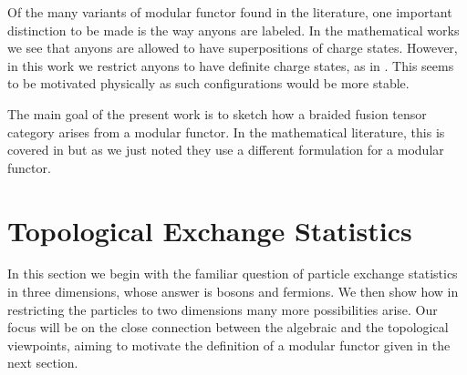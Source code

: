 Of the many variants of modular functor found in the literature,
one important distinction to be made is
the way anyons are labeled.
In the mathematical works \cite{Turaev1994, Bakalov2001, Tillmann1998} 
we see that anyons are allowed to have superpositions
of charge states. 
However, in this work we restrict anyons to have
definite charge states, as in \cite{Walker1991,Freedman2002simulation,Beverland2014}. 
This seems to be motivated physically as such configurations
would be more stable. %

The main goal of the present work is to sketch how a
braided fusion tensor category arises from a modular functor.
In the mathematical literature,
this is covered in \cite{Turaev1994,Tillmann1998,Bakalov2001}
but as we just noted they use a different formulation for a
modular functor.




%
%

\section{Topological Exchange Statistics}

In this section we begin with the familiar question 
of particle exchange statistics in three dimensions, whose answer is bosons and fermions.
We then show how in restricting the particles to two dimensions many
more possibilities arise.
Our focus will be on the close connection between the algebraic and the topological viewpoints,
aiming to motivate the definition of a modular functor given in the next section.

